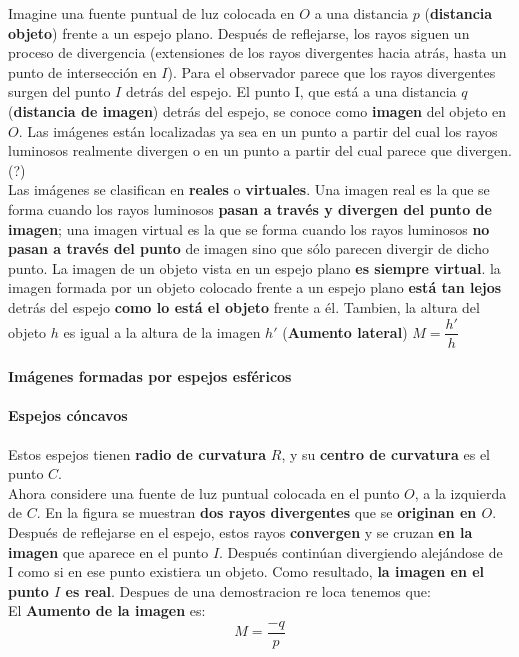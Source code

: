 \documentclass[10pt]{article}
\begin{document}
Imagine una fuente puntual de luz colocada en $O$ a una distancia $p$ (\textbf{distancia objeto}) frente a un espejo plano. Después de reflejarse, los rayos siguen un proceso de divergencia (extensiones de los rayos divergentes hacia atrás,
hasta un punto de intersección en $I$).  Para el observador parece que los rayos divergentes surgen del punto $I$ detrás del espejo. El punto I, que está a una distancia $q$ (\textbf{distancia de imagen}) detrás del espejo, se conoce como \textbf{imagen} del objeto en $O$.  Las imágenes están localizadas ya sea en un punto a partir del cual los rayos luminosos realmente divergen o en un punto a partir del cual parece que divergen. (?)\\
\linebreak
Las imágenes se clasifican en \textbf{reales} o \textbf{virtuales}. Una imagen real es la que se forma cuando los rayos luminosos \textbf{pasan a través y divergen del punto de imagen}; una imagen virtual es la que se forma cuando los rayos luminosos \textbf{no pasan a través del punto} de imagen sino que sólo parecen divergir de dicho punto. La imagen de un objeto vista en un espejo plano \textbf{es siempre virtual}.  la imagen formada por un objeto colocado frente a un espejo plano \textbf{está tan lejos} detrás del espejo \textbf{como lo está el objeto} frente a él. Tambien,  la altura del objeto $h$ es igual a la altura de la imagen $h'$ (\textbf{Aumento lateral}) $M = \dfrac{h'}{h}$

\paragraph{Imágenes formadas por espejos esféricos}

\paragraph{Espejos cóncavos}  Estos espejos tienen \textbf{radio de curvatura} $R$, y su \textbf{centro de curvatura} es el punto $C$.\\
Ahora considere una fuente de luz puntual colocada en el punto $O$, a la izquierda de $C$. En la figura se muestran \textbf{dos rayos divergentes} que se \textbf{originan en $O$}. Después de reflejarse en el espejo, estos rayos \textbf{convergen} y se cruzan \textbf{en la imagen} que aparece en el punto $I$. Después continúan divergiendo alejándose de I como si en ese punto existiera un objeto. Como resultado, \textbf{la imagen en el punto $I$ es real}. Despues de una demostracion re loca tenemos que:\\
\linebreak
El \textbf{Aumento de la imagen} es:
\begin{equation*}
	M = \dfrac{-q}{p}
\end{equation*}
\end{document}
